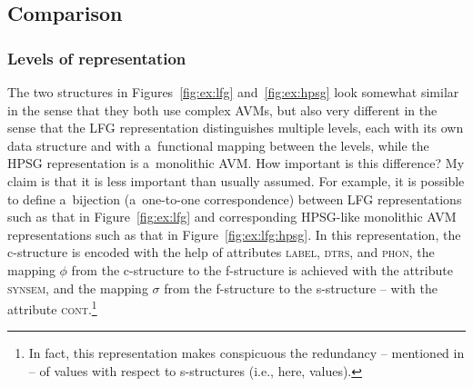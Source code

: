 \documentclass[output=paper,hidelinks]{langscibook}
\begin{document}
\subsection{Comparison}
\label{sec:arch:cmp}

\subsubsection{Levels of representation}
\label{sec:arch:lev}

The two structures in Figures~\ref{fig:ex:lfg} and~\ref{fig:ex:hpsg} look somewhat similar in the sense that they both use complex AVMs, but also very different in the sense that the LFG representation distinguishes multiple levels, each with its own data structure and with a~functional mapping between the levels, while the HPSG representation is a~monolithic AVM.  How important is this difference?  My claim is that it is less important than usually assumed.  For example, it is possible to define a~bijection (a~one-to-one correspondence) between LFG representations such as that in Figure~\ref{fig:ex:lfg} and corresponding HPSG-like monolithic AVM representations such as that in Figure~\ref{fig:ex:lfg:hpsg}. In this representation, the c-structure is encoded with the help of attributes \textsc{label}, \textsc{dtrs}, and \textsc{phon}, the mapping $\phi$ from the c-structure to the f-structure is achieved with the attribute \textsc{synsem}, and the mapping $\sigma$ from the f-structure to the s-structure -- with the attribute \textsc{cont}.\footnote{\label{fn:pred}In fact, this representation makes conspicuous the redundancy -- mentioned in  -- of \PRED values with respect to s-structures (i.e., here,  values).}
\end{document}
